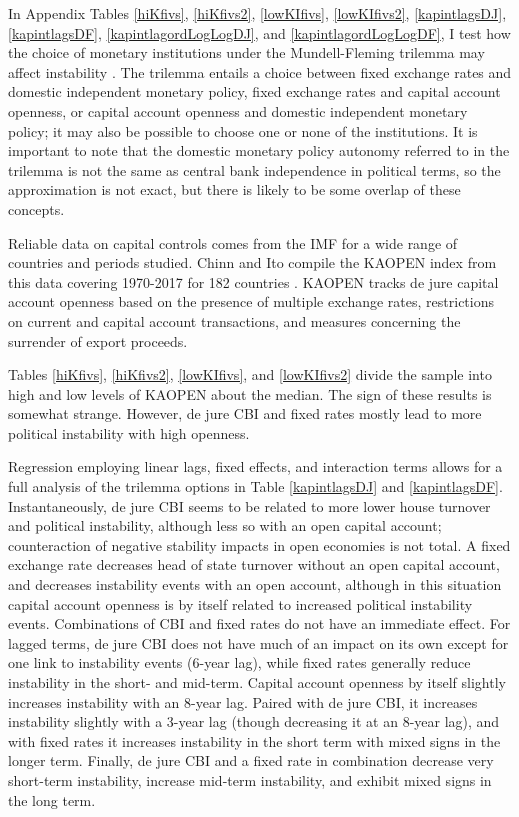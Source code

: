 \documentclass{article}
\begin{document}
    In Appendix Tables \ref*{hiKfivs}, \ref*{hiKfivs2}, \ref*{lowKIfivs}, \ref*{lowKIfivs2}, \ref*{kapintlagsDJ}, \ref*{kapintlagsDF}, \ref*{kapintlagordLogLogDJ}, and \ref*{kapintlagordLogLogDF}, I test how the choice of monetary institutions under the Mundell-Fleming trilemma may affect instability \citep{fleming_domestic_1962,mundell_capital_1963}. The trilemma entails a choice between fixed exchange rates and domestic independent monetary policy, fixed exchange rates and capital account openness, or capital account openness and domestic independent monetary policy; it may also be possible to choose one or none of the institutions. It is important to note that the domestic monetary policy autonomy referred to in the trilemma is not the same as central bank independence in political terms, so the approximation is not exact, but there is likely to be some overlap of these concepts.

    Reliable data on capital controls comes from the IMF for a wide range of countries and periods studied. Chinn and Ito compile the KAOPEN index from this data covering 1970-2017 for 182 countries \citep{chinn_what_2005}. KAOPEN tracks de jure capital account openness based on the presence of multiple exchange rates, restrictions on current and capital account transactions, and measures concerning the surrender of export proceeds.

    Tables \ref*{hiKfivs}, \ref*{hiKfivs2}, \ref*{lowKIfivs}, and \ref*{lowKIfivs2} divide the sample into high and low levels of KAOPEN about the median. The sign of these results is somewhat strange. However, de jure CBI and fixed rates mostly lead to more political instability with high openness.

    Regression employing linear lags, fixed effects, and interaction terms allows for a full analysis of the trilemma options in Table \ref*{kapintlagsDJ} and \ref*{kapintlagsDF}. Instantaneously, de jure CBI seems to be related to more lower house turnover and political instability, although less so with an open capital account; counteraction of negative stability impacts in open economies is not total. A fixed exchange rate decreases head of state turnover without an open capital account, and decreases instability events with an open account, although in this situation capital account openness is by itself related to increased political instability events. Combinations of CBI and fixed rates do not have an immediate effect. For lagged terms, de jure CBI does not have much of an impact on its own except for one link to instability events (6-year lag), while fixed rates generally reduce instability in the short- and mid-term. Capital account openness by itself slightly increases instability with an 8-year lag. Paired with de jure CBI, it increases instability slightly with a 3-year lag (though decreasing it at an 8-year lag), and with fixed rates it increases instability in the short term with mixed signs in the longer term. Finally, de jure CBI and a fixed rate in combination decrease very short-term instability, increase mid-term instability, and exhibit mixed signs in the long term.
\end{document}

